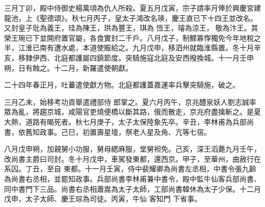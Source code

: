 \begin{pinyinscope}
 三月丁卯，殿中侍御史楊萬頃為仇人所殺。夏五月戊寅，宗子請率月俸於興慶宮建龍池，上《聖德頌》。秋七月丙子，皇太子鴻改名瑛，慶王直已下十四王並改名。又封皇子玭為義王，珪為陳王，珙為豐王，琪為
 恆王，璿為涼王，敬為汴王。其榮王琬已下並開府置官屬，各食實封二千戶。八月戊子，制鰥寡惸獨免今年地稅之半，江淮已南有遭水處，本道使賑給之。九月戊申，移泗州就臨淮縣置。冬十月辛亥，移隸伊西、北庭都護屬四鎮節度。突騎施寇北庭及安西撥換城。十一月壬申朔，日有蝕之。十二月，新羅遣使朝獻。



 二十四年春正月，吐蕃遣使獻方物。北庭都護蓋嘉運率兵擊突騎施，破之。



 三月乙未，始移考功貢舉遣禮部侍
 郎掌之。夏六月丙午，京兆醴泉妖人劉志誠率眾為亂，將趨京城，咸陽官吏燒便橋以斷其路，俄而散走，京兆府盡擒斬之。是夏大熱，道路有暍死者。秋七月庚子，太子太保陸象先卒。辛丑，李林甫為兵部尚書，依舊知政事。己巳，初置壽星壇，祭老人星及角、亢等七宿。



 八月戊申朔，加親舅小功服，舅母緦麻服，堂舅袒免。己亥，深王滔薨九月壬午，改尚書主爵曰司封。冬十月戊申，車駕發東都，還西京。甲子，至華州，曲赦行在系囚。丁丑，至自
 東都。十一月壬寅，侍中裴耀卿為尚書左丞相，中書令張九齡為尚書右丞相，並罷知政事。兵部尚書李林甫兼中書令，殿中監牛仙客兵部尚書、同中書門下三品。尚書右丞相蕭嵩為太子太師，工部尚書韓休為太子少保。十二月戊申，太子太師、慶王琮為司徒。丙寅，牛仙
 客知門
 下省事。



\end{pinyinscope}